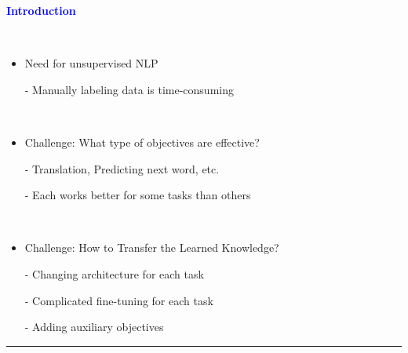 \documentclass[professionalfont]{beamer}
\begin{document}
\begin{frame}
\begin{refsection}

\begin{center}
    { \textbf{\textcolor{blue}{ {\fontsize{12}{14}\selectfont Introduction } }} }
\end{center}
\\[0.2cm]

{\fontsize{10}{14}\selectfont 
\begin{itemize}
    \item Need for unsupervised NLP

    - Manually labeling data is time-consuming
    
    \\[0.3cm]
    
    \item Challenge: What type of objectives are effective?

    - Translation\cite{translation}, Predicting next word\cite{predict-next-word}, etc.

    - Each works better for some tasks than others

    \\[0.3cm]

    \item Challenge: How to Transfer the Learned Knowledge?

    - Changing architecture for each task

    - Complicated fine-tuning for each task

    - Adding auxiliary objectives
\end{itemize}
}

\vspace{0.3cm}
\hrule
\printbibliography

\end{refsection}
\end{frame}
\end{document}
